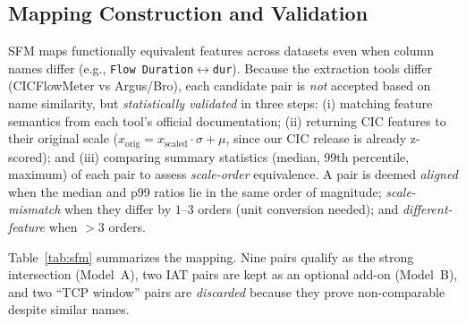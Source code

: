 \documentclass[preprint,12pt,authoryear]{elsarticle}
\begin{document}
\subsection{Mapping Construction and Validation}
\label{sec:sfmmap}
SFM maps functionally equivalent features across datasets even when column names
differ (e.g., \texttt{Flow Duration}$\leftrightarrow$\texttt{dur}). Because the
extraction tools differ (CICFlowMeter vs Argus/Bro), each candidate pair is
\emph{not} accepted based on name similarity, but \emph{statistically validated}
in three steps: (i) matching feature semantics from each tool's official
documentation; (ii) returning CIC features to their original scale
($x_{\text{orig}} = x_{\text{scaled}}\cdot\sigma + \mu$, since our CIC release is
already z-scored); and (iii) comparing summary statistics (median, 99th
percentile, maximum) of each pair to assess \emph{scale-order} equivalence. A pair
is deemed \emph{aligned} when the median and p99 ratios lie in the same order of
magnitude; \emph{scale-mismatch} when they differ by $1$--$3$ orders (unit
conversion needed); and \emph{different-feature} when $>3$ orders.

Table~\ref{tab:sfm} summarizes the mapping. Nine pairs qualify as the strong
intersection (Model~A), two IAT pairs are kept as an optional add-on (Model~B),
and two ``TCP window'' pairs are \emph{discarded} because they prove
non-comparable despite similar names.
\end{document}
